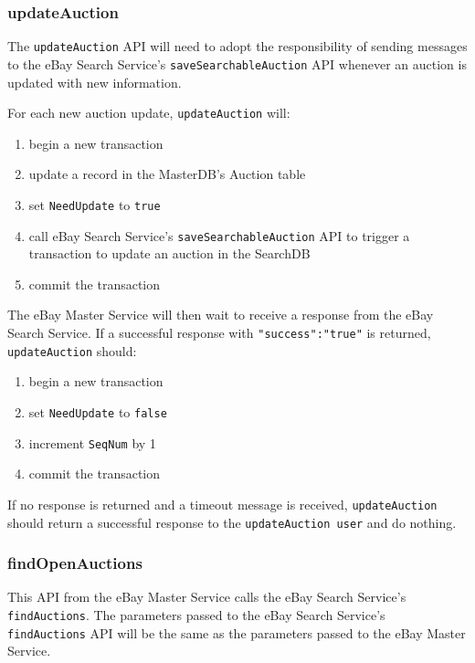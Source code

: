 \documentclass[12pt,a4paper]{article}
\begin{document}
\pagebreak
\subsubsection{updateAuction}

The \texttt{updateAuction} API will need to adopt the responsibility of sending messages to the eBay Search Service's
\texttt{saveSearchableAuction} API whenever an auction is updated with new information.

For each new auction update, \texttt{updateAuction} will:

\begin{enumerate}
    \item begin a new transaction
    \item update a record in the MasterDB's Auction table
    \item set \texttt{NeedUpdate} to \texttt{true}
    \item call eBay Search Service's \texttt{saveSearchableAuction} API to trigger a transaction to update an auction in the SearchDB
    \item commit the transaction
\end{enumerate}


The eBay Master Service will then wait to receive a response from the eBay Search Service. 
If a successful response with \texttt{"success":"true"} is returned, 
 \texttt{updateAuction} should:
 
 \begin{enumerate}
     \item begin a new transaction
     \item set \texttt{NeedUpdate} to \texttt{false}
     \item increment \texttt{SeqNum} by 1
     \item commit the transaction
 \end{enumerate}


 If no response is returned and a timeout message is received, \texttt{updateAuction} 
 should return a successful response to the \texttt{updateAuction user} and do nothing.

 
\subsubsection{findOpenAuctions}
This API from the eBay Master Service calls the eBay Search Service's \texttt{findAuctions}.
The parameters passed to the eBay Search Service's \texttt{findAuctions} API will be the same
as the parameters passed to the eBay Master Service.
\vspace{\baselineskip}
\end{document}
